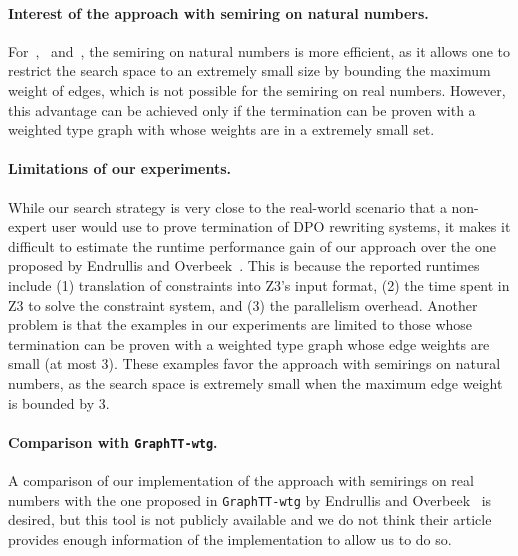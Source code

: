  \paragraph{Interest of the approach with semiring on natural numbers.}
For~\cite[Example 4]{plump2018modular},~\cite[Example 5 and 6]{bruggink2015proving} and~\cite[Example 5]{bruggink2014termination}, the semiring on natural numbers is more efficient, as it allows one to restrict the search space to an extremely small size by bounding the maximum weight of edges, which is not possible for the semiring on real numbers. However, this advantage can be achieved only if the termination can be proven with a weighted type graph with whose weights are in a extremely small set.
\paragraph{Limitations of our experiments.} 
While our search strategy is very close to the real-world scenario that a non-expert user would use to prove termination of DPO rewriting systems, 
it makes it difficult to estimate the runtime performance gain of our approach over the one proposed by Endrullis and Overbeek~\cite{endrullis2024generalized_arxiv_v2}.  
This is because the reported runtimes include (1) translation of constraints into Z3's input format, (2) the time spent in Z3 to solve the constraint system, and (3) the parallelism overhead. 
Another problem is that the examples in our experiments are limited to those whose termination can be proven with a weighted type graph whose edge weights are small (at most 3). These examples favor the approach with semirings on natural numbers, as the search space is extremely small when the maximum edge weight is bounded by 3.
\paragraph{Comparison with \texttt{GraphTT-wtg}.}
A comparison of our implementation of the approach with semirings on real numbers with the one proposed in \texttt{GraphTT-wtg} by Endrullis and Overbeek~\cite{endrullis2024generalized_arxiv_v3} is desired, but this tool is not publicly available and we do not think their article provides enough information of the implementation to allow us to do so.